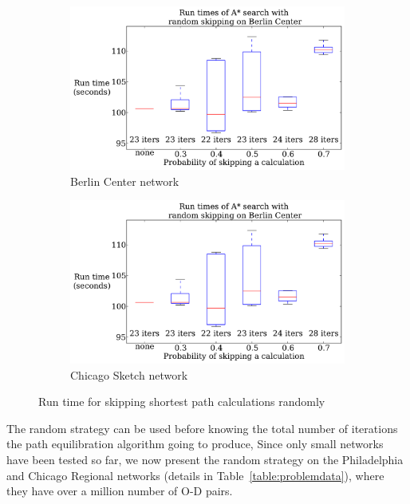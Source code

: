 \begin{figure}[!ht]
    \centering
    \begin{subfigure}{.5\textwidth}
        \centering
        \includegraphics[page=1,width=\textwidth]{img/random_time}
        \caption{Berlin Center network}
        \label{fig:berlin_random_n}
    \end{subfigure}%
    \begin{subfigure}{.5\textwidth}
        \centering
        \includegraphics[page=2,width=\textwidth]{img/random_time}
        \caption{Chicago Sketch network}
        \label{fig:chicago_random_n}
    \end{subfigure}
    \caption{Run time for skipping shortest path calculations randomly}
    \label{fig:random_n}
\end{figure}

The random strategy can be used before knowing the total number of iterations the path equilibration algorithm going to produce,
Since only small networks have been tested so far,
we now present the random strategy on the Philadelphia and Chicago Regional networks (details in Table~\ref{table:problemdata}), where they have over a million number of O-D pairs.

